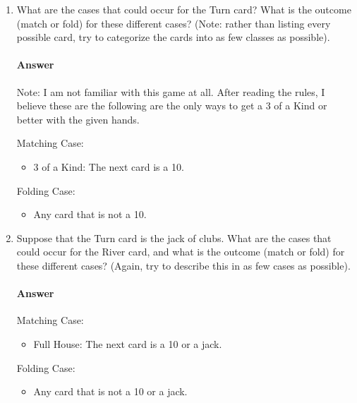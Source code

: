 \documentclass{article}
\begin{document}
\begin{enumerate}

    \item What are the cases that could occur for the Turn card?  What is the
        outcome (match or fold) for these different cases? (Note: rather than
        listing every possible card, try to categorize the cards into as few
        classes as possible).

    \paragraph{Answer} Note: I am not familiar with this game at all. After reading the rules, I believe these are the following are the only ways to get a 3 of a Kind or better with the given hands.

	Matching Case:
	\begin{itemize}

    	\item 3 of a Kind: The next card is a 10. 
\end{itemize}
Folding Case:
	\begin{itemize}

    	\item Any card that is not a 10. 
\end{itemize}
    \item Suppose that the Turn card is the jack of clubs.
        What are the cases that could occur for the River card, and what is the
        outcome (match or fold) for these different cases?  (Again, try to
        describe this in as few cases as possible).

    \paragraph{Answer}
    Matching Case:
	\begin{itemize}

    	\item Full House: The next card is a 10 or a jack. 
	
\end{itemize}
Folding Case:
	\begin{itemize}

    	\item Any card that is not a 10 or a jack. 
\end{itemize}

\end{enumerate}


\end{document}
